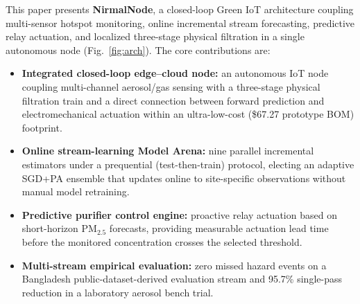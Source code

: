 This paper presents \textbf{NirmalNode}, a closed-loop Green IoT architecture coupling
multi-sensor hotspot monitoring, online incremental stream forecasting, predictive
relay actuation, and localized three-stage physical filtration in a single autonomous
node (Fig.~\ref{fig:arch}). The core contributions are:
\begin{itemize}[leftmargin=*,topsep=2pt,itemsep=1pt]
  \item \textbf{Integrated closed-loop edge--cloud node:} an autonomous IoT node coupling
    multi-channel aerosol/gas sensing with a three-stage physical filtration train and
    a direct connection between forward prediction and electromechanical actuation within
    an ultra-low-cost (\$67.27 prototype BOM) footprint.
  \item \textbf{Online stream-learning Model Arena:} nine parallel incremental estimators
    under a prequential (test-then-train) protocol, electing an adaptive SGD+PA ensemble
    that updates online to site-specific observations without manual model retraining.
  \item \textbf{Predictive purifier control engine:} proactive relay actuation based on
    short-horizon PM$_{2.5}$ forecasts, providing measurable actuation lead time before
    the monitored concentration crosses the selected threshold.
  \item \textbf{Multi-stream empirical evaluation:} zero missed hazard events on a
    Bangladesh public-dataset-derived evaluation stream and 95.7\% single-pass \pmtf{}
    reduction in a laboratory aerosol bench trial.
\end{itemize}
